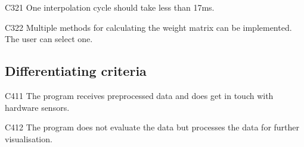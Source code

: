 	\begin{aims}
	
		\item[C321] One interpolation cycle should take less than 17ms.
		\item[C322] Multiple methods for calculating the weight matrix can be implemented. The user can select one.
	
	\end{aims}
	
	
\subsection{Differentiating criteria}
	
	\begin{aims}
		
		\item[C411] The program receives preprocessed data and does get in touch with hardware sensors.
		\item[C412] The program does not evaluate the data but processes the data for further visualisation. %
	
	\end{aims}
	



	
